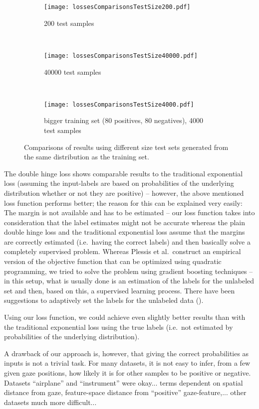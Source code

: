 \begin{figure}[ht]
	\centering
	\begin{subfigure}[h]{0.45\textwidth}
	\texttt{[image: lossesComparisonsTestSize200.pdf]}	
		\caption*{200 test samples}
	\end{subfigure}
	~
	\begin{subfigure}[h]{0.45\textwidth}
	\texttt{[image: lossesComparisonsTestSize40000.pdf]}	
		\caption*{40000 test samples}
	\end{subfigure}
	~
	\begin{subfigure}[h]{\textwidth}
	\texttt{[image: lossesComparisonsTestSize4000.pdf]}	
		\caption*{bigger training set (80 positives, 80 negatives), 4000 test samples}
	\end{subfigure}
	\caption{Comparisons of results using different size test sets generated from the same distribution as the training set. }
	\label{fig:loss-functions-comparisons}
\end{figure}

The double hinge loss shows comparable results to the traditional exponential loss (assuming the input-labels are based on probabilities of the underlying distribution whether or not they are positive) -- however, the above mentioned loss function performs better; the reason for this can be explained very easily: The margin is not available and has to be estimated -- our loss function takes into consideration that the label estimates might not be accurate whereas the plain double hinge loss and the traditional exponential loss assume that the margins are correctly estimated (i.e.\ having the correct labels) and then basically solve a completely supervised problem. Whereas Plessis et al.\ construct an empirical version of the objective function that can be optimized using quadratic programming, we tried to solve the problem using gradient boosting techniques -- in this setup, what is usually done is an estimation of the labels for the unlabeled set and then, based on this, a supervised learning process. There have been suggestions to adaptively set the labels for the unlabeled data (). 

Using our loss function, we could achieve even slightly better results than with the traditional exponential loss using the true labels (i.e.\ not estimated by probabilities of the underlying distribution).

A drawback of our approach is, however, that giving the correct probabilities as inputs is not a trivial task. For many datasets, it is not easy to infer, from a few given gaze positions, how likely it is for other samples to be positive or negative. Datasets ``airplane'' and ``instrument'' were okay... terms dependent on spatial distance from gaze, feature-space distance from ``positive'' gaze-feature,... other datasets much more difficult...

